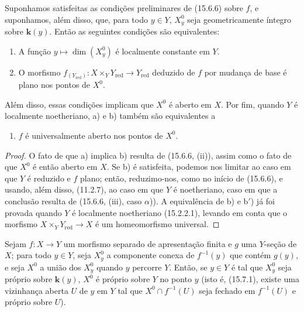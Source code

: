 \begin{corollary}[15.6.7]
\label{IV.15.6.7}
Suponhamos satisfeitas as condições preliminares de (15.6.6) sobre $f$, e suponhamos, além disso, que, para todo $y\in Y$, $X_y^0$ seja geometricamente íntegro sobre $\mathbf{k}(y)$. Então as seguintes condições são equivalentes:
\begin{enumerate}[label=\emph{\alph*)}]
  \item A função $y\mapsto\dim(X_y^0)$ é localmente constante em $Y$.
  \item O morfismo $f_{(Y_{\mathrm{red}})}:X\times_Y Y_{\mathrm{red}}\to Y_{\mathrm{red}}$ deduzido de $f$ por mudança de base é plano nos pontos de $X^0$.
\end{enumerate}
Além disso, essas condições implicam que $X^0$ é aberto em $X$. Por fim, quando $Y$ é localmente noetheriano, a) e b) também são equivalentes a
\begin{enumerate}
  \item[\rm b$'$)] $f$ é universalmente aberto nos pontos de $X^0$.
\end{enumerate}
\end{corollary}

\begin{proof}
O fato de que a) implica b) resulta de (15.6.6, (ii)), assim como o fato de que $X^0$ é então aberto em $X$. Se b) é satisfeita, podemos nos limitar ao caso em que $Y$ é reduzido e $f$ plano; então, reduzimo-nos, como no início de (15.6.6), e usando, além disso, (11.2.7), ao caso em que $Y$ é noetheriano, caso em que a conclusão resulta de (15.6.6, (iii), caso $\alpha$)). A equivalência de b) e b$'$) já foi provada quando $Y$ é localmente noetheriano (15.2.2.1), levando em conta que o morfismo $X\times_Y Y_{\mathrm{red}}\to X$ é um homeomorfismo universal.
\end{proof}

\begin{proposition}[15.6.8]
\label{IV.15.6.8}
Sejam $f:X\to Y$ um morfismo separado de apresentação finita e $g$ uma $Y$-seção de $X$; para todo $y\in Y$, seja $X_y^0$ a componente conexa de $f^{-1}(y)$ que contém $g(y)$, e seja $X^0$ a união dos $X_y^0$ quando $y$ percorre $Y$. Então, se $y\in Y$ é tal que $X_y^0$ seja próprio sobre $\mathbf{k}(y)$, $X^0$ é próprio sobre $Y$ no ponto $y$ (isto é, (15.7.1), existe uma vizinhança aberta $U$ de $y$ em $Y$ tal que $X^0\cap f^{-1}(U)$ seja fechado em $f^{-1}(U)$ e próprio sobre $U$).
\end{proposition}

